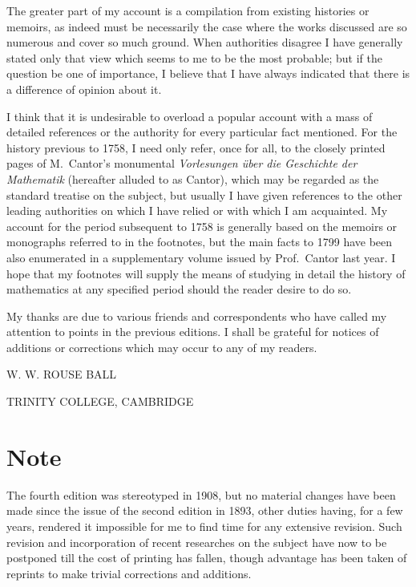\documentclass[12pt,oneside]{book}
\begin{document}
The greater part of my account is a compilation from existing histories or memoirs, as indeed must be necessarily the case where the works discussed are
so numerous and cover so much ground. When authorities disagree I have generally stated only that view which seems to me to be the most probable; but if
the question be one of importance, I believe that I have always indicated that there is a difference of opinion about it. \par 

I think that it is undesirable to overload a popular account with a mass of detailed references or the authority for every particular fact mentioned.
For the history previous to 1758, I need only refer, once for all, to the closely printed pages of M.~Cantor's monumental \textit{Vorlesungen \"uber die Geschichte der Mathematik}
(hereafter alluded to as Cantor), which may be regarded as the standard treatise on the subject, but usually I have given references to the other leading 
authorities on which I have relied or with which I am acquainted. My account for the period subsequent to 1758 is generally based on the memoirs or monographs referred to
in the footnotes, but the main facts to 1799 have been also enumerated in a supplementary volume issued by Prof.~Cantor last year. I hope that my footnotes will supply 
the means of studying in detail the history of mathematics at any specified period should the reader desire to do so. \par 

My thanks are due to various friends and correspondents who have called my attention to points in the previous editions. I shall be grateful for notices
of additions or corrections which may occur to any of my readers. \par

\begin{flushright}
    {\Large W. W. ROUSE BALL}
\end{flushright}
{\footnotesize TRINITY COLLEGE, CAMBRIDGE}

\chapter{Note}
The fourth edition was stereotyped in 1908, but no material changes have been made since the issue of the second edition in 1893, other duties having,
for a few years, rendered it impossible for me to find time for any extensive revision. Such revision and incorporation of recent researches 
on the subject have now to be postponed till the cost of printing has fallen, though advantage has been taken of reprints to make trivial corrections
and additions. \par 
\end{document}
